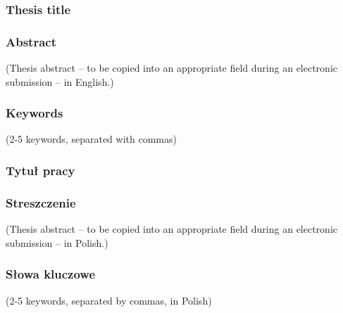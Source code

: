 \documentclass[a4paper,twoside,12pt]{book}
\begin{document}
\cleardoublepage

\rmfamily\normalfont
\pagestyle{empty}



\subsubsection*{Thesis title} \Title

\subsubsection*{Abstract}  
(Thesis abstract – to be copied into an appropriate field during an electronic submission – in English.)

\subsubsection*{Keywords} 
(2-5 keywords, separated with commas)

\subsubsection*{Tytuł pracy} 
\begin{otherlanguage}{polish}
\TitleAlt
\end{otherlanguage}

\subsubsection*{Streszczenie} 
\begin{otherlanguage}{polish}
(Thesis abstract – to be copied into an appropriate field during an electronic submission – in Polish.)
\end{otherlanguage}
\subsubsection*{Słowa kluczowe}  
\begin{otherlanguage}{polish}
(2-5 keywords, separated by commas, in Polish)
\end{otherlanguage}




\tableofcontents
\end{document}
